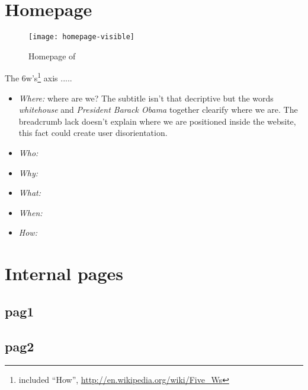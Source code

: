 \documentclass[
12pt, %
a4paper, %
oneside, %
headinclude,footinclude, %
BCOR5mm, %
]{scrartcl}
\begin{document}

\newpage
\section{Homepage}

\begin{figure}[h]
\centering 
\centerline{\texttt{[image: homepage-visible]}}
\caption[Homepage]{Homepage of \thesite{}}
\label{fig:homepage} 
\end{figure}

The 6w's\footnote{included ``How'', \url{http://en.wikipedia.org/wiki/Five_Ws}} axis ..... %

\begin{itemize}[noitemsep]
	\item \textit{Where:} where are we? The subtitle isn't that decriptive but the words \emph{whitehouse} and \emph{President Barack Obama} together clearify where we are. The breadcrumb lack doesn't explain where we are positioned inside the website, this fact could create user disorientation.

	\item \textit{Who:}


	\item \textit{Why:}
	\item \textit{What:} 
	\item \textit{When:}
	\item \textit{How:}
\end{itemize}


\section{Internal pages}
	
	\subsection{pag1}

	\subsection{pag2}
\end{document}
